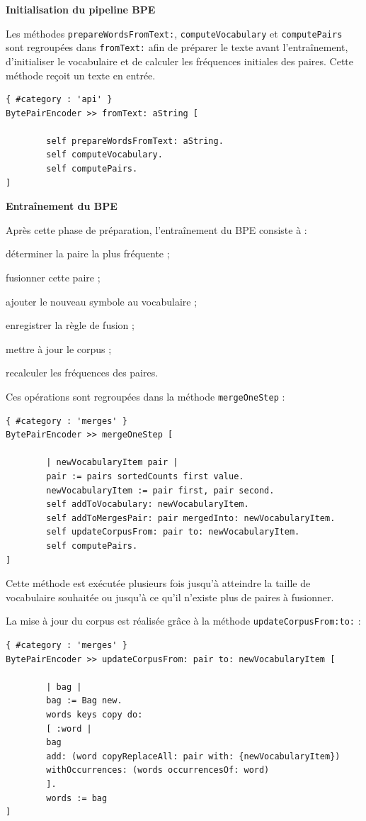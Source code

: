 \documentclass[12pt,a4paper]{report}
\begin{document}
\textbf{Initialisation du pipeline BPE}

Les méthodes \texttt{prepareWordsFromText:}, \texttt{computeVocabulary} et \texttt{computePairs} sont regroupées dans \texttt{fromText:} afin de préparer le texte avant l’entraînement, d’initialiser le vocabulaire et de calculer les fréquences initiales des paires. Cette méthode reçoit un texte en entrée.

\begin{verbatim}
{ #category : 'api' }
BytePairEncoder >> fromText: aString [

		self prepareWordsFromText: aString.
		self computeVocabulary.
		self computePairs.
]
\end{verbatim}

\textbf{Entraînement du BPE}

Après cette phase de préparation, l’entraînement du BPE consiste à :

\begin{itemizeFB}
	\item déterminer la paire la plus fréquente ;
	\item fusionner cette paire ;
	\item ajouter le nouveau symbole au vocabulaire ;
	\item enregistrer la règle de fusion ;
	\item mettre à jour le corpus ;
	\item recalculer les fréquences des paires.
\end{itemizeFB}

Ces opérations sont regroupées dans la méthode \texttt{mergeOneStep} :

\begin{verbatim}
{ #category : 'merges' }
BytePairEncoder >> mergeOneStep [

		| newVocabularyItem pair |
		pair := pairs sortedCounts first value.
		newVocabularyItem := pair first, pair second. 
		self addToVocabulary: newVocabularyItem.
		self addToMergesPair: pair mergedInto: newVocabularyItem.
		self updateCorpusFrom: pair to: newVocabularyItem.
		self computePairs.
]
\end{verbatim}

Cette méthode est exécutée plusieurs fois jusqu’à atteindre la taille de vocabulaire souhaitée ou jusqu’à ce qu’il n’existe plus de paires à fusionner.

La mise à jour du corpus est réalisée grâce à la méthode \texttt{updateCorpusFrom:to:} :

\begin{verbatim}
{ #category : 'merges' }
BytePairEncoder >> updateCorpusFrom: pair to: newVocabularyItem [

		| bag |
		bag := Bag new.
		words keys copy do: 
		[ :word |
		bag 
		add: (word copyReplaceAll: pair with: {newVocabularyItem}) 
		withOccurrences: (words occurrencesOf: word)
		].
		words := bag
]
\end{verbatim}
\end{document}
